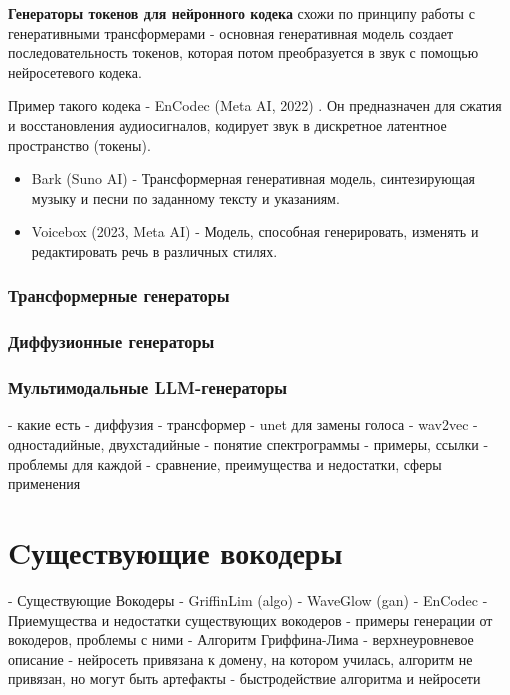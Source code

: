 \textbf{Генераторы токенов для нейронного кодека} схожи по принципу работы с генеративными трансформерами - основная генеративная модель создает последовательность токенов, 
которая потом преобразуется в звук с помощью нейросетевого кодека.

Пример такого кодека - EnCodec (Meta AI, 2022) \cite{encodec}. Он предназначен для сжатия и восстановления аудиосигналов, кодирует звук в дискретное латентное пространство (токены).

\begin{itemize} 
  \item Bark (Suno AI) \cite{SunoAI_Bark_2023} - Трансформерная генеративная модель, синтезирующая музыку и песни по заданному тексту и указаниям.
  \item Voicebox (2023, Meta AI) \cite{le2023voicebox} - Модель, способная генерировать, изменять и редактировать речь в различных стилях.
\end{itemize}


\subsubsection{Трансформерные генераторы}
\subsubsection{Диффузионные генераторы}
\subsubsection{Мультимодальные LLM-генераторы}




 - какие есть
   - диффузия
   - трансформер
   - unet для замены голоса
   - wav2vec
   - одностадийные, двухстадийные
 - понятие спектрограммы
 - примеры, ссылки
 - проблемы для каждой
 - сравнение, преимущества и недостатки, сферы применения

\section{Cуществующие вокодеры}
 - Существующие Вокодеры
  - GriffinLim (algo) \cite{1164317}
  - WaveGlow (gan)
  - EnCodec
 - Приемущества и недостатки существующих вокодеров 
 - примеры генерации от вокодеров, проблемы с ними
 - Алгоритм Гриффина-Лима
  - верхнеуровневое описание
 - нейросеть привязана к домену, на котором училась, алгоритм не привязан, но могут быть артефакты
 - быстродействие алгоритма и нейросети

